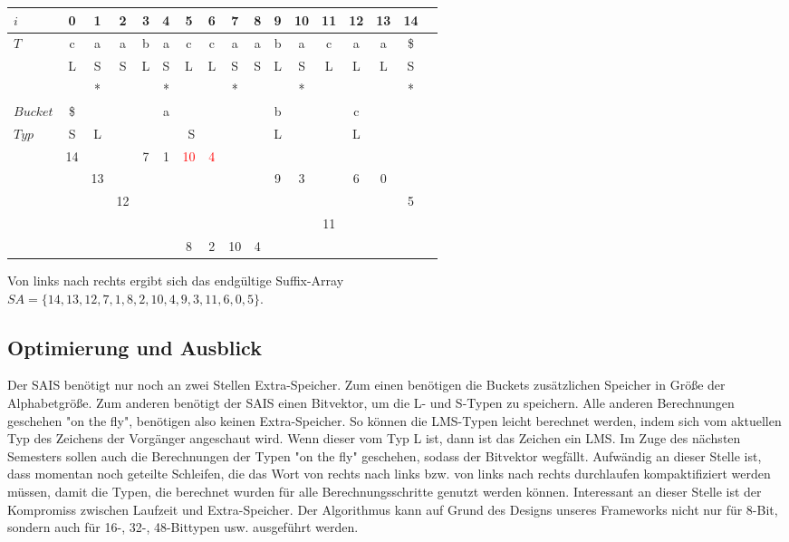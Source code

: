 \begin{center}
  \begin{tabular}{ | l | c | c | c | c | c | c | c | c | c | c | c | c | c | c | c | c | }
    \hline
        $i$ & 0 & 1 & 2 & 3 & 4 & 5 & 6 & 7 & 8 & 9 & 10 & 11 & 12 & 13 & 14 \\ \hline
        $T$ & c & a & a & b & a & c & c & a & a & b & a & c & a & a & \$ \\ \hline
            & L & S & S & L & S & L & L & S & S & L & S & L & L & L & S \\ \hline
            &   & * &   &   & * &   &   & * &   &   & * &   &   &   & * \\ \hline
   $Bucket$ &\$ & \multicolumn{7}{c}{a} &   & \multicolumn{1}{c}{b} &   & \multicolumn{3}{c}{c} & \\ \hline
      $Typ$ & S & \multicolumn{1}{c}{L} &   & \multicolumn{5}{c}{S} &   & \multicolumn{1}{c}{L} &    & \multicolumn{3}{c}{L} &\\ \hline
            & 14 & & & 7 & 1 & \textcolor{red}{10} & \textcolor{red}{4} & & &  &   & &   &   &  \\ \hline
            & & 13 & & & & & & & & 9 & 3 & & 6 & 0 & \\ \hline
            &  &  & 12 & & & & & & & & & & &  & 5 \\ \hline
            & & & & & &   & & &   &   & & 11 & & & \\ \hline
            & & & & & & 8 & 2 & 10 & 4 &   & &   &   &   & \\
    \hline
  \end{tabular}
\end{center}
\bigskip
Von links nach rechts ergibt sich das endgültige Suffix-Array \\
$SA = \{14, 13, 12, 7, 1, 8, 2, 10, 4, 9, 3, 11, 6, 0, 5\}$.

\subsection{Optimierung und Ausblick}
Der SAIS benötigt nur noch an zwei Stellen Extra-Speicher. Zum einen benötigen die Buckets zusätzlichen Speicher in Größe der Alphabetgröße. Zum anderen benötigt der SAIS einen Bitvektor, um die L- und S-Typen zu speichern. Alle anderen Berechnungen geschehen "on the fly", benötigen also keinen Extra-Speicher. So können die LMS-Typen leicht berechnet werden, indem sich vom aktuellen Typ des Zeichens der Vorgänger angeschaut wird. Wenn dieser vom Typ L ist, dann ist das Zeichen ein LMS. Im Zuge des nächsten Semesters sollen auch die Berechnungen der Typen "on the fly" geschehen, sodass der Bitvektor wegfällt. Aufwändig an dieser Stelle ist, dass momentan noch geteilte Schleifen, die das Wort von rechts nach links bzw. von links nach rechts durchlaufen kompaktifiziert werden müssen, damit die Typen, die berechnet wurden für alle Berechnungsschritte genutzt werden können. Interessant an dieser Stelle ist der Kompromiss zwischen Laufzeit und Extra-Speicher. Der Algorithmus kann auf Grund des Designs unseres Frameworks nicht nur für 8-Bit, sondern auch für 16-, 32-, 48-Bittypen usw. ausgeführt werden.

